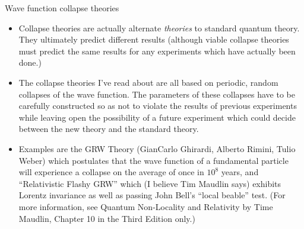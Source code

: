 \documentclass[9pt,usenames,dvipsnames]{beamer}
\begin{document}
\begin{frame}[t]{Wave function collapse theories}
\begin{itemize}
\vspace{6pt}
\item Collapse theories are actually alternate {\em theories} to standard
    quantum theory. They ultimately predict different results (although 
    viable collapse theories must predict the same results for any experiments
    which have actually been done.)

\vspace{6pt}
\item The collapse theories I've read about are all based on periodic, random
    collapses of the wave function. The parameters of these collapses have to
    be carefully constructed so as not to violate the results of previous
    experiments while leaving open the possibility of a future experiment which
    could decide between the new theory and the standard theory.

\vspace{6pt}
\item Examples are the GRW Theory (GianCarlo Ghirardi, Alberto Rimini, 
    Tulio Weber) which postulates that the wave function of a fundamental
    particle will experience a collapse on the average of once in
    $10^8$ years, and ``Relativistic Flashy GRW'' which 
    (I believe Tim Maudlin says) exhibits Lorentz invariance as well as
    passing John Bell's ``local beable'' test. (For more information, see
    Quantum Non-Locality and Relativity by Time Maudlin, Chapter 10 in
    the Third Edition only.)
    
    
\end{itemize}
\end{frame}
\end{document}
